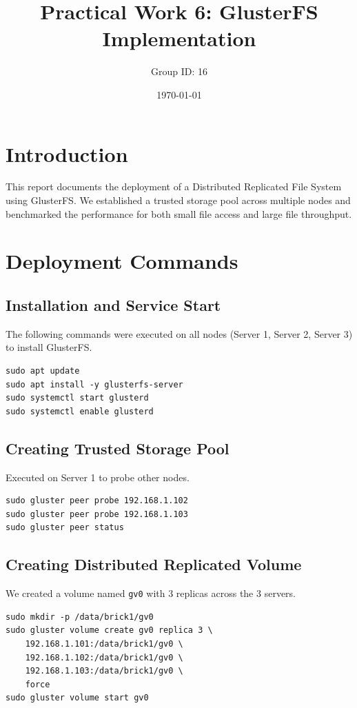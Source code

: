\documentclass[a4paper,11pt]{article}
\title{\textbf{Practical Work 6: GlusterFS Implementation}}
\author{Group ID: 16}
\date{\today}
\begin{document}
\maketitle

\section{Introduction}
This report documents the deployment of a Distributed Replicated File System using GlusterFS. We established a trusted storage pool across multiple nodes and benchmarked the performance for both small file access and large file throughput.

\section{Deployment Commands}

\subsection{Installation and Service Start}
The following commands were executed on all nodes (Server 1, Server 2, Server 3) to install GlusterFS.

\begin{lstlisting}
sudo apt update
sudo apt install -y glusterfs-server
sudo systemctl start glusterd
sudo systemctl enable glusterd
\end{lstlisting}

\subsection{Creating Trusted Storage Pool}
Executed on Server 1 to probe other nodes.

\begin{lstlisting}
sudo gluster peer probe 192.168.1.102
sudo gluster peer probe 192.168.1.103
sudo gluster peer status
\end{lstlisting}

\subsection{Creating Distributed Replicated Volume}
We created a volume named \texttt{gv0} with 3 replicas across the 3 servers.

\begin{lstlisting}
sudo mkdir -p /data/brick1/gv0
sudo gluster volume create gv0 replica 3 \
    192.168.1.101:/data/brick1/gv0 \
    192.168.1.102:/data/brick1/gv0 \
    192.168.1.103:/data/brick1/gv0 \
    force
sudo gluster volume start gv0
\end{lstlisting}
\end{document}

